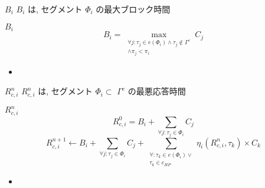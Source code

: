 \begin{frame}{$B_i$}
    $B_i$ は, セグメント $\Phi_{i}$ の最大ブロック時間
    \begin{block}{$B_i$}
        \begin{equation*}
            B_i=\max _{\substack{\forall j: \tau_j \in e\left(\Phi_i\right) \wedge \tau_j \notin \Gamma^c \\ \wedge \pi_j<\pi_i}}{C_j}
        \end{equation*}

        \setlength{\linewidth}{0.98\columnwidth}
        \begin{itemize}
            \item {}
        \end{itemize}
    \end{block}
\end{frame}

\begin{frame}{$R_{c, i}^{n}$}
    $R_{c, i}^{n}$ は, セグメント $\Phi_{i} \subset$  $\Gamma^{c}$ の最悪応答時間
    \begin{block}{$R_{c, i}^{n}$}
        \begin{equation*}
            R_{c, i}^{0}=B_{i}+ \sum_{\forall j: \tau_{j} \in \Phi_{i}} C_{j}
        \end{equation*}
        \begin{equation*}
            R_{c, i}^{n+1} \leftarrow B_{i}+\sum_{\forall j: \tau_{j} \in \Phi_{i}} C_{j}+\sum_{\substack{\forall: \tau_{k} \in e\left(\Phi_{i}\right) \vee \\ \tau_{k} \in e_{H P}}} \eta_{i}\left(R_{c, i}^{n}, \tau_{k}\right) \times C_{k}
        \end{equation*}

        \setlength{\linewidth}{0.98\columnwidth}
        \begin{itemize}
            \item {}
        \end{itemize}
    \end{block}
\end{frame}

